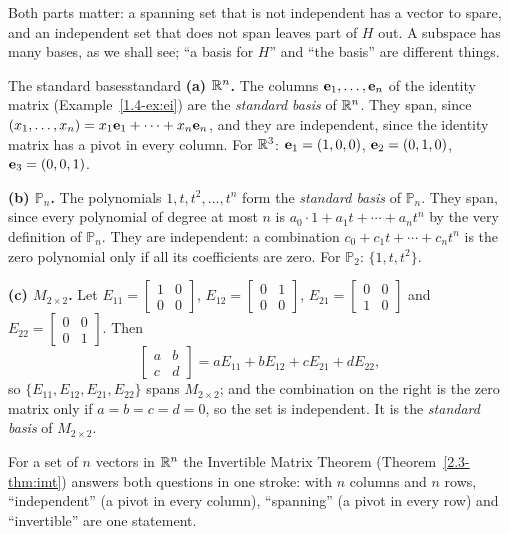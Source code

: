\documentclass[11pt]{article}
\begin{document}
Both parts matter: a spanning set that is not independent has a vector to spare, and an independent set that does not span leaves part of $H$ out. A subspace has many bases, as we shall see; ``a basis for $H$'' and ``the basis'' are different things.

\begin{exmp}{The standard bases}{standard}
\textbf{(a) $\mathbb{R}^n$.} The columns $\mathbf{e}_1,\dots,\mathbf{e}_n$ of the identity matrix (Example~\ref{1.4-ex:ei}) are the \emph{standard basis} of $\mathbb{R}^n$. They span, since $(x_1,\dots,x_n)=x_1\mathbf{e}_1+\cdots+x_n\mathbf{e}_n$, and they are independent, since the identity matrix has a pivot in every column. For $\mathbb{R}^3$: $\mathbf{e}_1=(1,0,0)$, $\mathbf{e}_2=(0,1,0)$, $\mathbf{e}_3=(0,0,1)$.

\textbf{(b) $\mathbb{P}_n$.} The polynomials $1,t,t^2,\dots,t^n$ form the \emph{standard basis} of $\mathbb{P}_n$. They span, since every polynomial of degree at most $n$ is $a_0\cdot1+a_1t+\cdots+a_nt^n$ by the very definition of $\mathbb{P}_n$. They are independent: a combination $c_0+c_1t+\cdots+c_nt^n$ is the zero polynomial only if all its coefficients are zero. For $\mathbb{P}_2$: $\{1,t,t^2\}$.

\textbf{(c) $M_{2\times2}$.} Let $E_{11}=\begin{bmatrix}1&0\\0&0\end{bmatrix}$, $E_{12}=\begin{bmatrix}0&1\\0&0\end{bmatrix}$, $E_{21}=\begin{bmatrix}0&0\\1&0\end{bmatrix}$ and $E_{22}=\begin{bmatrix}0&0\\0&1\end{bmatrix}$. Then
\[
\begin{bmatrix}a&b\\c&d\end{bmatrix}=aE_{11}+bE_{12}+cE_{21}+dE_{22},
\]
so $\{E_{11},E_{12},E_{21},E_{22}\}$ spans $M_{2\times2}$; and the combination on the right is the zero matrix only if $a=b=c=d=0$, so the set is independent. It is the \emph{standard basis} of $M_{2\times2}$.
\end{exmp}

For a set of $n$ vectors in $\mathbb{R}^n$ the Invertible Matrix Theorem (Theorem~\ref{2.3-thm:imt}) answers both questions in one stroke: with $n$ columns and $n$ rows, ``independent'' (a pivot in every column), ``spanning'' (a pivot in every row) and ``invertible'' are one statement.
\end{document}
